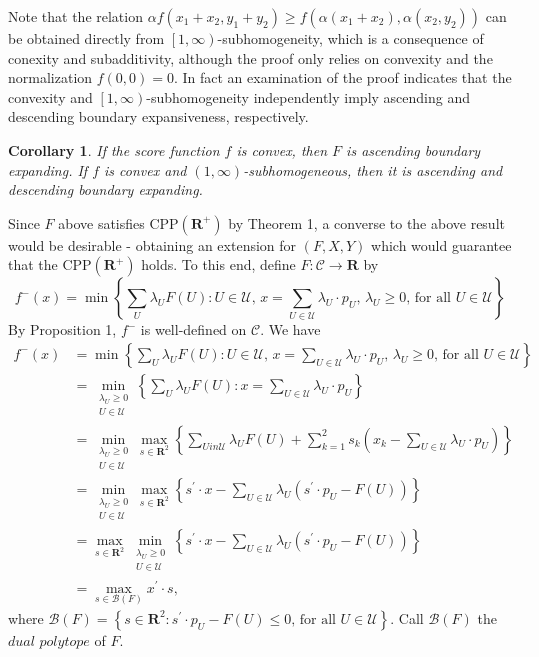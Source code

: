 \documentclass{article}
\newtheorem{corollary}{Corollary}
\theoremstyle{case}
\begin{document}
Note that the relation $\alpha f(x_1+x_2, y_1+y_2) \geq f(\alpha(x_1+x_2), \alpha(x_2,y_2))$ can be obtained directly from $\left[1, \infty\right)$-subhomogeneity, which is a consequence of conexity and subadditivity, although the proof only relies on convexity and the normalization $f(0,0) = 0$. In fact an examination of the proof indicates that the convexity and $\left[1, \infty\right)$-subhomogeneity independently imply ascending and descending boundary expansiveness, respectively.
\begin{corollary}
If the score function $f$ is convex, then $F$ is ascending boundary expanding. If $f$ is convex and $(1, \infty)$-subhomogeneous, then it is ascending and descending boundary expanding.
\end{corollary}
Since $F$ above satisfies CPP$(\mathbf{R}^+)$ by Theorem 1, a converse to the above result would be desirable - obtaining an extension for $(F,X,Y)$ which would guarantee that the CPP$(\mathbf{R}^+)$ holds. To this end, define $F:\mathcal{C} \to \mathbf{R}$ by
\[
f^-(x) = \min{\left\lbrace \sum_{U}\lambda_U F(U) \colon U \in \mathcal{U} \text{, } x = \sum_{U \in \mathcal{U}}\lambda_U \cdot p_U \text{, } \lambda_U \geq 0 \text{, for all } U \in \mathcal{U}\right\rbrace}
\]
By Proposition 1, $f^-$ is well-defined on $\mathcal{C}$. We have
\begin{align*}
f^-(x) &= \min{\left\lbrace \sum_{U}\lambda_U F(U) \colon U \in \mathcal{U} \text{, } x = \sum_{U \in \mathcal{U}} \lambda_U \cdot p_U \text{, } \lambda_U \geq 0 \text{, for all } U \in \mathcal{U}\right\rbrace}\\
&= \min_{\substack{\lambda_U \geq 0 \\ U \in \mathcal{U}}}{\left\lbrace \sum_{U}\lambda_U F(U) \colon  x = \sum_{U \in \mathcal{U}} \lambda_U \cdot p_U\right\rbrace} \\
&= \min_{\substack{\lambda_U \geq 0 \\ U \in \mathcal{U}}}\max_{s \in \mathbf{R}^2}{\left\lbrace \sum_{U in \mathcal{U}}\lambda_U F(U)  + \sum_{k=1}^2 s_k\left( x_k - \sum_{U \in \mathcal{U}} \lambda_U \cdot p_U\right)\right\rbrace} \\
&= \min_{\substack{\lambda_U \geq 0 \\ U \in \mathcal{U}}}\max_{s \in \mathbf{R}^2}{\left\lbrace s^{\prime} \cdot x - \sum_{U \in \mathcal{U}}\lambda_U\left( s^{\prime} \cdot p_U - F(U)\right)\right\rbrace} \\
&= \max_{s \in \mathbf{R}^2}\min_{\substack{\lambda_U \geq 0 \\ U \in \mathcal{U}}}{\left\lbrace s^{\prime} \cdot x - \sum_{U \in \mathcal{U}}\lambda_U\left( s^{\prime} \cdot p_U - F(U)\right)\right\rbrace} \\
&= \max_{s \in \mathcal{B}(F)}{x^{\prime} \cdot s},
\end{align*}
where $\mathcal{B}(F) = \left\lbrace s \in \mathbf{R}^2 \colon s^{\prime} \cdot p_U - F(U) \leq 0 \text{, for all } U \in \mathcal{U}\right\rbrace$. Call $\mathcal{B}(F)$ the $\textit{dual polytope}$ of $F$. 
\end{document}
